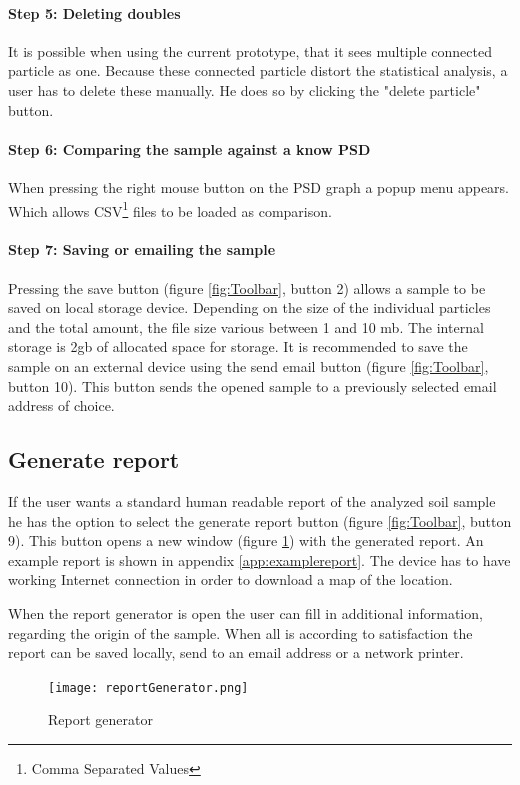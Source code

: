 \documentclass[11pt,fleqn,,a4paper,twoside,openright]{book}
\begin{document}
\paragraph{Step 5: Deleting doubles}
It is possible when using the current prototype, that it sees multiple connected particle as one. Because these connected particle distort the statistical analysis, a user has to delete these manually. He does so by clicking the "delete particle" button.

\paragraph{Step 6: Comparing the sample against a know PSD}
When pressing the right mouse button on the PSD graph a popup menu appears. Which allows CSV\footnote{Comma Separated Values} files to be loaded as comparison.

\paragraph{Step 7: Saving or emailing the sample}
Pressing the save button (figure \ref{fig:Toolbar}, button 2) allows a sample to be saved on local storage device. Depending on the size of the individual particles and the total amount, the file size various between 1 and 10 mb. The internal storage is 2gb of allocated space for storage. It is recommended to save the sample on an external device using the send email button (figure \ref{fig:Toolbar}, button 10). This button sends the opened sample to a previously selected email address of choice.

\subsection{Generate report}
If the user wants a standard human readable report of the analyzed soil sample he has the option to select the generate report button (figure \ref{fig:Toolbar}, button 9). This button opens a new window (figure \ref{fig:Repgen}) with the generated report. An example report is shown in appendix \ref{app:examplereport}. The device has to have working Internet connection in order to download a map of the location.

When the report generator is open the user can fill in additional information, regarding the origin of the sample. When all is according to satisfaction the report can be saved locally, send to an email address or a network printer.
\begin{figure}[h]
	\centering
	\texttt{[image: reportGenerator.png]}
	\caption{Report generator}\label{fig:Repgen}
\end{figure}
 
\end{document}
